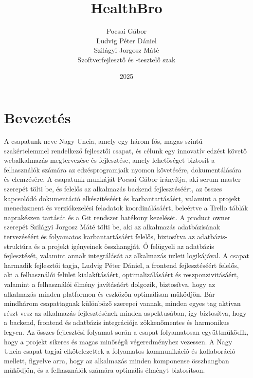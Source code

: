 \documentclass[colorlinks]{thesis-kando}
\theoremstyle{definition}
\theoremstyle{remark}
\begin{document}
\title{HealthBro}
\author{Pocsai Gábor\\Ludvig Péter Dániel\\Szilágyi Jorgosz Máté\\Szoftverfejlesztő és -tesztelő szak}
\date{2025}
\maketitle
\tableofcontents

\chapter*{Bevezetés}
A csapatunk neve Nagy Uncia, amely egy három fős, magas szintű szakértelemmel rendelkező fejlesztői csapat, és célunk egy innovatív edzést követő webalkalmazás megtervezése és fejlesztése, amely lehetőséget biztosít a felhasználók számára az edzésprogramjaik nyomon követésére, dokumentálására és elemzésére.
\newline
A csapatunk munkáját Pocsai Gábor irányítja, aki scrum master szerepét tölti be, és felelős az alkalmazás backend fejlesztéséért, az összes kapcsolódó dokumentáció elkészítéséért és karbantartásáért, valamint a projekt menedzsment és verziókezelési feladatok koordinálásáért, beleértve a Trello táblák naprakészen tartását és a Git rendszer hatékony kezelését.
\newline
A product owner szerepét Szilágyi Jorgosz Máté tölti be, aki az alkalmazás adatbázisának tervezéséért és folyamatos karbantartásáért felelős, biztosítva az adatbázis-struktúra és a projekt igényeinek összhangját. Ő felügyeli az adatbázis fejlesztését, valamint annak integrálását az alkalmazás üzleti logikájával.
\newline
A csapat harmadik fejlesztői tagja, Ludvig Péter Dániel, a frontend fejlesztéséért felelős, aki a felhasználói felület kialakításáért, optimalizálásáért és reszponzivitásáért, valamint a felhasználói élmény javításáért dolgozik, biztosítva, hogy az alkalmazás minden platformon és eszközön optimálisan működjön.
\newline
Bár mindhárom csapattagnak különböző szerepei vannak, minden egyes tag aktívan részt vesz az alkalmazás fejlesztésének minden aspektusában, így biztosítva, hogy a backend, frontend és adatbázis integrációja zökkenőmentes és harmonikus legyen. Az összes fejlesztési folyamat során a csapat folyamatosan együttműködik, hogy a projekt sikeres és magas minőségű végeredményhez vezessen.
\newline
A Nagy Uncia csapat tagjai elkötelezettek a folyamatos kommunikáció és kollaboráció mellett, figyelve arra, hogy az alkalmazás minden komponense összhangban működjön, és a felhasználók számára optimális élményt biztosítson.
\end{document}

